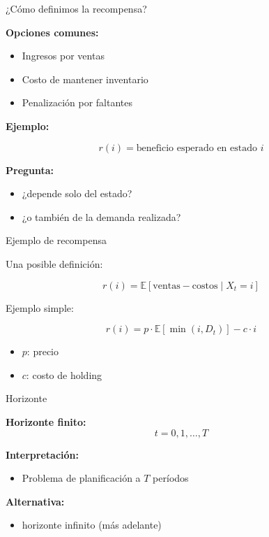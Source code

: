 \documentclass{beamer}
\begin{document}
\begin{frame}{¿Cómo definimos la recompensa?}

\textbf{Opciones comunes:}

\pause

\begin{itemize}
\item Ingresos por ventas
\item Costo de mantener inventario
\item Penalización por faltantes
\end{itemize}

\pause

\textbf{Ejemplo:}

\[
r(i) = \text{beneficio esperado en estado } i
\]

\pause

\textbf{Pregunta:}
\begin{itemize}
\item ¿depende solo del estado?
\item ¿o también de la demanda realizada?
\end{itemize}

\end{frame}

\begin{frame}{Ejemplo de recompensa}

Una posible definición:

\[
r(i) = \mathbb{E}[\text{ventas} - \text{costos} \mid X_t = i]
\]

\pause

Ejemplo simple:

\[
r(i) = p \cdot \mathbb{E}[\min(i, D_t)] - c \cdot i
\]

\pause

\begin{itemize}
\item \(p\): precio
\item \(c\): costo de holding
\end{itemize}

\end{frame}

\begin{frame}{Horizonte}

\textbf{Horizonte finito:}
\[
t = 0,1,\dots,T
\]

\pause

\textbf{Interpretación:}
\begin{itemize}
\item Problema de planificación a \(T\) períodos
\end{itemize}

\pause

\textbf{Alternativa:}
\begin{itemize}
\item horizonte infinito (más adelante)
\end{itemize}

\end{frame}
\end{document}
